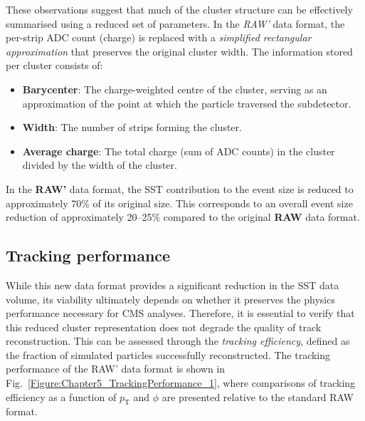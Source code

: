 These observations suggest that much of the cluster structure can be effectively summarised using a reduced set of parameters.  In the \textit{RAW'} data format, the per-strip ADC count (charge) is replaced with a \textit{simplified rectangular approximation} that preserves the original cluster width. The information stored per cluster consists of:

\begin{itemize}
    \item \textbf{Barycenter}: The charge-weighted centre of the cluster, serving as an approximation of the point at which the particle traversed the subdetector.
    \item \textbf{Width}: The number of strips forming the cluster.
    \item \textbf{Average charge}: The total charge (sum of ADC counts) in the cluster divided by the width of the cluster.
\end{itemize}

In the \textbf{RAW'} data format, the \ac{SST} contribution to the event size is reduced to approximately 70\% of its original size. This corresponds to an overall event size reduction of approximately 20–25\% compared to the original \textbf{RAW} data format.

\subsection{Tracking performance}

While this new data format provides a significant reduction in the \ac{SST} data volume, its viability ultimately depends on whether it preserves the physics performance necessary for \ac{CMS} analyses. Therefore, it is essential to verify that this reduced cluster representation does not degrade the quality of track reconstruction. This can be assessed through the \textit{tracking efficiency}, defined as the fraction of simulated particles successfully reconstructed. The tracking performance of the RAW' data format is shown in Fig.~\ref{Figure:Chapter5_TrackingPerformance_1}, where comparisons of tracking efficiency as a function of $p_\mathrm{T}$ and $\phi$ are presented relative to the standard RAW format.

